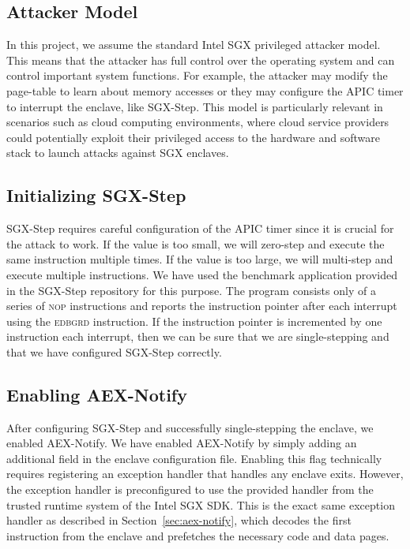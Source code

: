 \documentclass{llncs}
\begin{document}
\subsection{Attacker Model}

In this project, we assume the standard Intel SGX privileged attacker model.
This means that the attacker has full control over the operating system
and can control important system functions.
For example, the attacker may modify the page-table to learn about memory accesses
or they may configure the APIC timer to interrupt the enclave, like SGX-Step.
This model is particularly relevant in scenarios such as cloud computing
environments, where cloud service providers could potentially exploit their
privileged access to the hardware and software stack to launch attacks against SGX enclaves.

\subsection{Initializing SGX-Step}


SGX-Step requires careful configuration of the APIC timer
since it is crucial for the attack to work.
If the value is too small, we will zero-step and execute the same instruction multiple times.
If the value is too large, we will multi-step and execute multiple instructions.
We have used the benchmark application provided in the SGX-Step repository for this purpose.
The program consists only of a series of \textsc{nop} instructions and
reports the instruction pointer after each interrupt using the \textsc{edbgrd} instruction.
If the instruction pointer is incremented by one instruction each interrupt,
then we can be sure that we are single-stepping and
that we have configured SGX-Step correctly.


\subsection{Enabling AEX-Notify}

After configuring SGX-Step and successfully single-stepping the enclave, we
enabled AEX-Notify.
We have enabled AEX-Notify by simply adding an additional field in the enclave
configuration file.
Enabling this flag technically requires registering an exception handler that
handles any enclave exits.
However, the exception handler is preconfigured to use the provided handler
from the trusted runtime system of the Intel SGX SDK.
This is the exact same exception handler as described in
Section~\ref{sec:aex-notify}, which decodes the first instruction from the
enclave and prefetches the necessary code and data pages.
\end{document}
